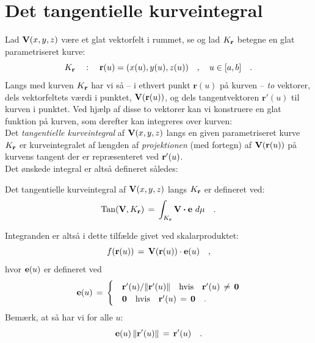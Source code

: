 
\section{Det tangentielle kurveintegral} \label{secTangKurveInt}
Lad ${\bf V}(x,y,z)$ være et glat vektorfelt i rummet, se  og lad
$K_{\bf r}$ betegne en glat parametriseret kurve:
\begin{equation}
K_{\bf r} \quad : \quad \mathbf{r}(u) = (x(u), y(u), z(u)) \quad , \quad u \in [a, b] \quad.
\end{equation}
Langs med kurven $K_{\bf r}$ har vi så -- i ethvert punkt $\mathbf{r}(u)$ på kurven --  \emph{to} vektorer, dels vektorfeltets værdi i
punktet, ${\bf V}(\mathbf{r}(u))$, og dels tangentvektoren $\mathbf{r}'(u)$ til kurven i punktet. Ved hjælp af disse to vektorer kan vi konstruere en glat funktion på kurven, som derefter kan integreres over kurven: \\


Det {\em tangentielle kurveintegral} af ${\bf
V}(x,y,z)$ langs en given parametriseret kurve $K_{\bf r}$ er
kurve\-in\-te\-gralet af længden af \emph{projektionen} (med fortegn) af ${\bf V}({\bf
r}(u))$ på kurvens tangent der er repræsenteret ved ${\bf r}'(u)$. \\

Det ønskede integral er altså defineret således:

\begin{definition}
Det tangentielle kurveintegral af ${\bf
V}(x,y,z)$ langs $K_{\bf r}$ er defineret ved:
\begin{equation}
\operatorname{Tan}({\bf V}, K_{\bf r})\, = \, \int_{K_{\bf r}}{\bf V} \bm{\cdot} {\bf e}\,\,d\mu \quad .
\end{equation}
\end{definition}

Integranden er altså i dette tilfælde givet
ved skalarproduktet:
\begin{equation}
f({\bf r}(u)) \, = \, {\bf V}({\bf r}(u))\cdot {\bf e}(u) \quad ,
\end{equation}
hvor ${\bf e}(u)$ er defineret ved
\begin{equation}
{\bf e}(u)\, = \,
\begin{cases}
&{\bf r}'(u)/ \Vert {\bf r}'(u) \Vert  \quad \text{hvis}\quad {\bf r}'(u)\,
\neq \,
{\bf 0} \\
&{\bf 0} \quad \text{hvis} \quad {\bf r}'(u)\, = \, {\bf 0} \quad
.
\end{cases}
\end{equation}
Bemærk, at så har vi for alle $u$:
\begin{equation}
{\bf e}(u)\,\Vert {\bf r}'(u) \Vert \, = \, {\bf r}'(u) \quad .
\end{equation}


